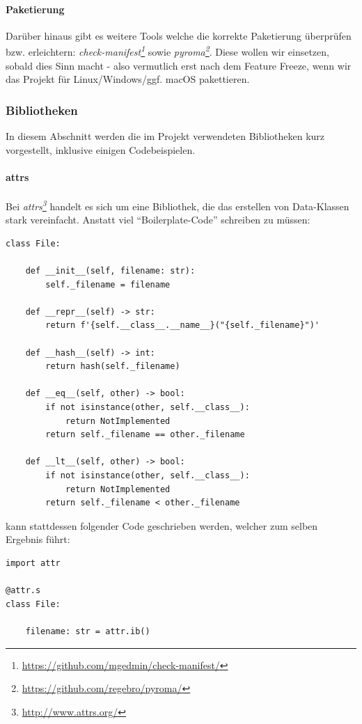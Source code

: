 \documentclass[a4paper]{article}
\newcommand{\tool}[2]{\emph{#1\footnote{\url{#2}}}}
\begin{document}
\paragraph{Paketierung} Darüber hinaus gibt es weitere Tools welche die
korrekte Paketierung überprüfen bzw. erleichtern:
\tool{check-manifest}{https://github.com/mgedmin/check-manifest/}
sowie \tool{pyroma}{https://github.com/regebro/pyroma/}. Diese
wollen wir einsetzen, sobald dies Sinn macht - also vermutlich erst nach dem
Feature Freeze, wenn wir das Projekt für Linux/Windows/ggf. macOS pakettieren.

\subsubsection{Bibliotheken}

In diesem Abschnitt werden die im Projekt verwendeten Bibliotheken kurz
vorgestellt, inklusive einigen Codebeispielen.

\paragraph{attrs} Bei \tool{attrs}{http://www.attrs.org/} handelt es sich um eine Bibliothek, die das
erstellen von Data-Klassen stark vereinfacht. Anstatt viel ``Boilerplate-Code''
schreiben zu müssen:

\begin{verbatim}
class File:

    def __init__(self, filename: str):
        self._filename = filename

    def __repr__(self) -> str:
        return f'{self.__class__.__name__}("{self._filename}")'

    def __hash__(self) -> int:
        return hash(self._filename)

    def __eq__(self, other) -> bool:
        if not isinstance(other, self.__class__):
            return NotImplemented
        return self._filename == other._filename

    def __lt__(self, other) -> bool:
        if not isinstance(other, self.__class__):
            return NotImplemented
        return self._filename < other._filename
\end{verbatim}

kann stattdessen folgender Code geschrieben werden, welcher zum selben Ergebnis führt:

\begin{verbatim}
import attr

@attr.s
class File:

    filename: str = attr.ib()
\end{verbatim}
\end{document}
